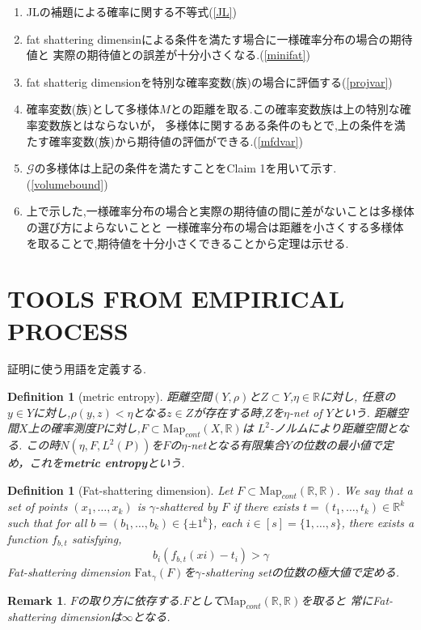 \documentclass{ujarticle}
\newtheorem{dfn}[thm]{Definition}
\newtheorem*{rem}{Remark}
\begin{document}
\begin{enumerate}
  \item JLの補題による確率に関する不等式(\ref{JL})
  \item fat shattering dimensinによる条件を満たす場合に一様確率分布の場合の期待値と
       実際の期待値との誤差が十分小さくなる.(\ref{minifat})
  \item fat shatterig dimensionを特別な確率変数(族)の場合に評価する(\ref{projvar})
  \item 確率変数(族)として多様体$M$との距離を取る.この確率変数族は上の特別な確率変数族とはならないが，
       多様体に関するある条件のもとで,上の条件を満たす確率変数(族)から期待値の評価ができる.(\ref{mfdvar})
  \item $\mathcal{G}$の多様体は上記の条件を満たすことをClaim 1を用いて示す.(\ref{volumebound})
  \item 上で示した,一様確率分布の場合と実際の期待値の間に差がないことは多様体の選び方によらないことと
       一様確率分布の場合は距離を小さくする多様体を取ることで,期待値を十分小さくできることから定理は示せる.
\end{enumerate}


\section{TOOLS FROM EMPIRICAL PROCESS}
\label{sec:TOOLS FROM EMPIRICAL PROCESS}
証明に使う用語を定義する.
\begin{dfn}[metric entropy]
 距離空間$(Y,\rho)$と$Z \subset Y$,$\eta \in \mathbb{R}$に対し,
 任意の$y \in Y$に対し,$\rho(y,z) <\eta$となる$z \in Z$が存在する時,$Z$を$\eta$-net of $Y$という.
 距離空間$X$上の確率測度$P$に対し,$F \subset \mathrm{Map}_{cont}(X,\mathbb{R})$は
 $L^2$-ノルムにより距離空間となる.
 この時$N(\eta,F,L^2(P))$を$F$の$\eta$-netとなる有限集合$Y$の位数の最小値で定め，これを\textbf{metric entropy}という.
\end{dfn}

\begin{dfn}[Fat-shattering dimension]
  Let $F \subset \mathrm{Map}_{cont}(\mathbb{R},\mathbb{R})$.
  We say that a set of points $(x_1, \dots, x_k)$ is $\gamma$-shattered by $F$
  if there exists $t = (t_1, \dots,t_k) \in \mathbb{R}^k$ such that for all
  $b = (b_1, \dots,b_k) \in \{ {\pm 1}^k \}$, each $i \in [s]= \{1, \dots,s\}$,
   there exists a function $f_{b,t}$ satisfying,
   \begin{equation*}
     b_i (f_{b,t}(xi) - t_i) >  \gamma
   \end{equation*}
  Fat-shattering dimension $\mathrm{Fat}_{\gamma}(F)$を$\gamma$-shattering setの位数の極大値で定める.
\end{dfn}
\begin{rem}
 $F$の取り方に依存する.$F$として$\mathrm{Map}_{cont}(\mathbb{R},\mathbb{R})$を取ると
 常にFat-shattering dimensionは$\infty$となる.
\end{rem}
\end{document}
